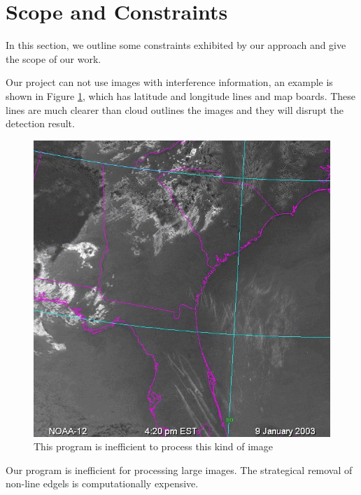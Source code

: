 \section{Scope and Constraints}
In this section, we outline some constraints exhibited by our approach and give
the scope of our work.

Our project can not use images with interference information, an example is shown
in Figure \ref{badexample}, which has latitude and longitude lines and map boards. 
These lines are much clearer than cloud outlines the images and they will 
disrupt the detection result.

\begin{figure}[htb!]
\centering
\includegraphics[scale=0.5]{pic/figure1.jpg}
\caption{This program is inefficient to process this kind of image}
\label{badexample}
\end{figure}
Our program is inefficient for processing large images. The 
strategical removal of non-line edgels is computationally expensive.
